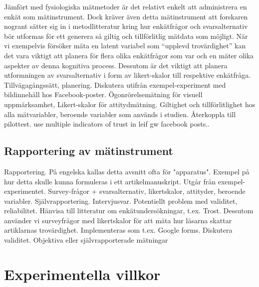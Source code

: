 \documentclass[
]{book}
\begin{document}
Jämfört med fysiologiska mätmetoder är det relativt enkelt att administrera en enkät som mätinstrument. Dock kräver även detta mätinstrument att forskaren nogrant sätter sig in i metodlitteratur kring hur enkätfrågor och svarsalternativ bör utformas för ett generera så giltig och tillförlitlig mätdata som möjligt. När vi exempelvis försöker mäta en latent variabel som ``upplevd trovärdighet'' kan det vara viktigt att planera för flera olika enkätfrågor som var och en mäter olika aspekter av denna kognitiva process. Dessutom är det viktigt att planera utformningen av svarsalternativ i form av likert-skalor till respektive enkätfråga. Tillvägagångssätt, planering. Diskutera utifrån exempel-experiment med bildinnehåll hos Facebook-poster. Ögonrörelsemätning för visuell uppmärksamhet, Likert-skalor för attitydmätning. Giltighet och tillförlitlighet hos alla mätvariabler, beroende variabler som används i studien. Återkoppla till pilottest. use multiple indicators of trust in leif gw facebook posts..

\hypertarget{sub07.3.6}{%
\subsection{Rapportering av mätinstrument}\label{sub07.3.6}}

Rapportering. På engelska kallas detta avsnitt ofta för "apparatus". Exempel på hur detta skulle kunna formuleras i ett artikelmanuskript. Utgår från exempel-experimentet. Survey-frågor + svarsalternativ, likertskalor, attityder, beroende variabler. Självrapportering. Intervjusvar. Potentiellt problem med validitet, reliabilitet. Hänvisa till litteratur om enkätundersökningar, t.ex. Trost. Dessutom använder vi surveyfrågor med likertskalor för att mäta hur läsarna skattar artiklarnas trovärdighet. Implementeras som t.ex. Google forms. Diskutera validitet. Objektiva eller självrapporterade mätningar

\hypertarget{sec07.4}{%
\section{Experimentella villkor}\label{sec07.4}}
\end{document}
